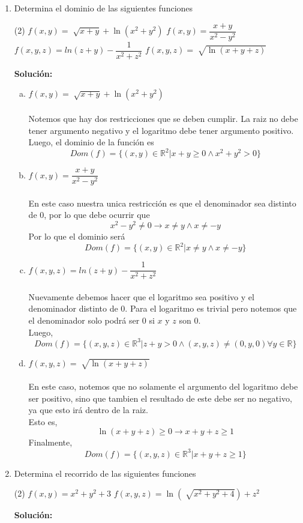 \documentclass[12pt]{article}
\newenvironment{solucion}
{\begin{mdframed}[backgroundcolor=black!10]
		{\bf Solución:}\\
	}
	{
	\end{mdframed}
}
\newenvironment{preguntas}
{\begin{enumerate}\itemsep12pt
	}
	{
	\end{enumerate}
}
\newcommand{\ra}{\rightarrow}
\newcommand{\R}{\mathbb{R}}
\begin{document}
\begin{preguntas}
\item Determina el dominio de las siguientes funciones
\begin{tasks}(2)
\task $f(x, y) = \sqrt[]{x+y} + \ln(x^2+y^2)$
\task $f(x,y) = \dfrac{x+y}{x^2-y^2}$
\task $f(x,y,z) = ln(z+y) - \dfrac{1}{x^2 +z^2}$
\task $f(x,y,z) = \sqrt[]{\ln(x+y+z)}$
\end{tasks}
\begin{solucion}

\begin{enumerate}[a)]
\item $f(x, y) = \sqrt[]{x+y} + \ln(x^2+y^2)$\\
\\
Notemos que hay dos restricciones que se deben cumplir. La raiz no debe tener argumento negativo y el logaritmo debe tener argumento positivo. Luego, el dominio de la función es
$$Dom(f) = \{(x,y) \in \R^2 | x + y \geq 0 \wedge x^2 + y^2 > 0\}$$
\item $f(x,y) = \dfrac{x+y}{x^2-y^2}$\\
\\
En este caso nuestra unica restricción es que el denominador sea distinto de 0, por lo que debe ocurrir que
$$x^2 - y^2 \neq 0 \ra x \neq y \wedge x \neq -y$$
Por lo que el dominio será
$$Dom(f) = \{(x,y) \in \R^2 | x \neq y \wedge x \neq -y\}$$
\item $f(x,y,z) = ln(z+y) - \dfrac{1}{x^2 +z^2}$\\
\\
Nuevamente debemos hacer que el logaritmo sea positivo y el denominador distinto de 0. Para el logaritmo es trivial pero notemos que el denominador solo podrá ser 0 si $x$ y $z$ son 0. \\

Luego,
$$Dom(f) = \{(x,y,z) \in \R^3 | z + y > 0 \wedge (x,y,z) \neq (0,y,0) \forall y \in \R \}$$
\item $f(x,y,z) = \sqrt[]{\ln(x+y+z)}$\\
\\
En este caso, notemos que no solamente el argumento del logaritmo debe ser positivo, sino que tambien el resultado de este debe ser no negativo, ya que esto irá dentro de la raiz.\\

Esto es,
$$\ln(x+y+z) \geq 0 \ra x + y + z \geq 1$$
Finalmente,
$$Dom(f) = \{(x,y,z) \in \R^3 | x + y + z \geq 1 \}$$
\end{enumerate}
\end{solucion}
\item Determina el recorrido de las siguientes funciones
\begin{tasks}(2)
\task $f(x,y) = x^2 + y^2 + 3$
\task $f(x,y,z) = \ln(\sqrt[]{x^2+y^2+4}) + z^2$
\end{tasks}
\begin{solucion}


\end{solucion}
\end{preguntas}
\end{document}
